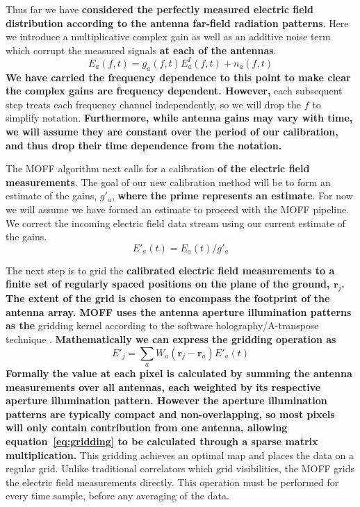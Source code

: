 \documentclass[a4paper,fleqn,usenatbib]{../mnras}
\begin{document}
Thus far we have \textbf{considered the perfectly measured electric field distribution according to 
the antenna far-field radiation patterns}. Here we introduce a multiplicative complex gain as 
well as an additive noise term which corrupt the measured signals \textbf{at each of the antennas}.
\begin{equation}\label{eq:apply_gain}
E_a(f,t) = g_a(f,t) E_a^I(f,t) + n_a(f,t)
\end{equation}
\textbf{We have carried the frequency dependence to this point to make clear the complex gains are
frequency dependent. However,} each subsequent step treats each frequency 
channel independently, so we will drop the $f$ to simplify notation. 
\textbf{Furthermore, while antenna gains may vary with time, we will assume they are constant over
the period of our calibration, and thus drop their time dependence from the notation.}

The MOFF algorithm next calls for a calibration \textbf{of the electric field measurements}. The goal of our new calibration method will be 
to form an estimate of the gains, $g'_a$, \textbf{where the prime represents an estimate}. For now we will assume we have formed an estimate 
to proceed with the MOFF pipeline. We correct the incoming electric field data stream using our 
current estimate of the gains.
\begin{equation}
E'_a(t) = E_a(t)/ g'_a
\end{equation}

The next step is to grid the \textbf{calibrated electric field measurements to a finite set of regularly spaced 
positions on the plane of the ground, $\mathbf{r}_j$.
The extent of the grid is chosen to encompass the footprint of the antenna array.
MOFF uses the antenna aperture illumination patterns as the} gridding 
kernel according to the software holography/A-transpose technique \citep{mor09,bha08}. 
\textbf{Mathematically we can express the gridding operation as}
\begin{equation}\label{eq:gridding}
E'_j=\sum_a W_a(\mathbf{r}_j-\mathbf{r}_a) E'_a(t)
\end{equation}
\textbf{Formally the value at each pixel is calculated by summing the antenna
measurements over all antennas, each weighted by its respective aperture illumination
pattern.
However the aperture illumination patterns are typically compact and non-overlapping, so most pixels
will only contain contribution from one antenna, allowing equation~\ref{eq:gridding}
to be calculated through a sparse matrix multiplication.}
This gridding 
achieves an optimal map \citep{teg97b} and places the data on a regular grid. Unlike 
traditional correlators which grid visibilities, the MOFF grids the electric field measurements directly. This 
operation must be performed for every time sample, before any averaging of the data.
\end{document}
